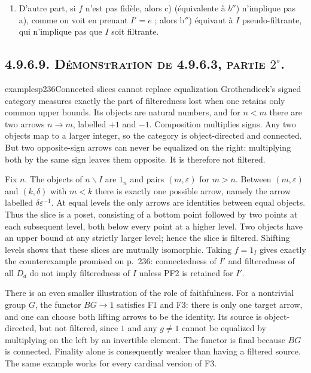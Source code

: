 \begin{enumerate}[label=\arabic*$^\circ$)]
\item D'autre part, si $f$ n'est pas fidèle, alors c) (équivalente à $b''$) n'implique pas a), comme on voit en prenant $I' = e$ ; alors b$''$) équivaut à $I$ pseudo-filtrante, qui n'implique pas que $I$ soit filtrante.
\end{enumerate}

\subsection*{\textbf{4.9.6.9.} \textsc{Démonstration de 4.9.6.3, partie} $2^\circ$.}

\begin{dcomment}{examples}{p236}{Connected slices cannot replace equalization}
Grothendieck's signed category measures exactly the part of filteredness lost when one retains only common upper bounds.  Its objects are natural numbers, and for $n<m$ there are two arrows $n\to m$, labelled $+1$ and $-1$.  Composition multiplies signs.  Any two objects map to a larger integer, so the category is object-directed and connected.  But two opposite-sign arrows can never be equalized on the right: multiplying both by the same sign leaves them opposite.  It is therefore not filtered.

Fix $n$.  The objects of $n\backslash I$ are $1_n$ and pairs $(m,\varepsilon)$ for $m>n$.  Between $(m,\varepsilon)$ and $(k,\delta)$ with $m<k$ there is exactly one possible arrow, namely the arrow labelled $\delta\varepsilon^{-1}$.  At equal levels the only arrows are identities between equal objects.  Thus the slice is a poset, consisting of a bottom point followed by two points at each subsequent level, both below every point at a higher level.  Two objects have an upper bound at any strictly larger level; hence the slice is filtered.  Shifting levels shows that these slices are mutually isomorphic.  Taking $f=1_I$ gives exactly the counterexample promised on p.~236: connectedness of $I'$ and filteredness of all $D_d$ do not imply filteredness of $I$ unless PF2 is retained for $I'$.

There is an even smaller illustration of the role of faithfulness.  For a nontrivial group $G$, the functor $BG\to1$ satisfies F1 and F3: there is only one target arrow, and one can choose both lifting arrows to be the identity.  Its source is object-directed, but not filtered, since $1$ and any $g\ne1$ cannot be equalized by multiplying on the left by an invertible element.  The functor is final because $BG$ is connected.  Finality alone is consequently weaker than having a filtered source.  The same example works for every cardinal version of F3.
\end{dcomment}


